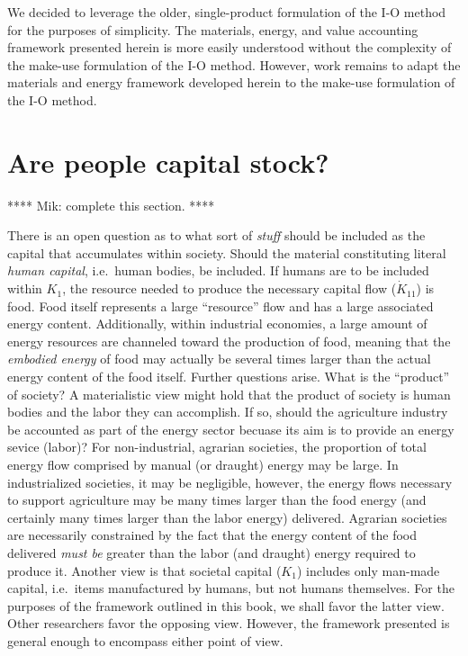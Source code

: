 We decided to leverage the older,
single-product formulation of the I-O method
for the purposes of simplicity. 
The materials, energy, and value accounting framework
presented herein is more easily understood 
without the complexity of the make-use formulation 
of the I-O method.
However, work remains to adapt the materials and energy framework
developed herein to the make-use formulation of the I-O method.


\section{Are people capital stock?}
\label{sec:people_as_stock}

**** Mik: complete this section. ****

There is an open
question as to what sort of \emph{stuff} 
should be included as the capital
that accumulates within society. 
Should the material constituting literal
\emph{human capital}, 
i.e.~human bodies, 
be included. 
If humans are to be included within $K_{1}$, 
the resource needed to produce the necessary capital
flow ($\dot{K}_{11}$) is food. 
Food itself represents a large ``resource''
flow and has a large associated energy content. 
Additionally, 
within industrial economies, 
a large amount of energy resources 
are channeled toward the production of food, 
meaning that the \emph{embodied energy}
of food may actually be several times larger than
the actual energy content of the food itself. 
Further questions arise. 
What is the ``product'' of society? 
A materialistic view might hold that the product of
society is human bodies and the labor they can accomplish. 
If so, 
should the agriculture industry 
be accounted as part of the energy sector 
becuase its aim is to provide 
an energy sevice (labor)? 
For non-industrial, agrarian societies, 
the proportion of total energy flow 
comprised by manual (or draught) energy 
may be large. 
In industrialized societies, 
it may be negligible, 
however, 
the energy flows necessary to support agriculture
may be many times larger than the food energy
(and certainly many times larger 
than the labor energy) 
delivered. 
Agrarian societies
are necessarily constrained by the fact that the energy content of the food delivered 
\emph{must be} greater than the labor (and draught) energy required to produce it.
Another view is that societal capital ($K_{1}$) includes only man-made capital, 
i.e.\ items manufactured by humans,
but not humans themselves. 
For the purposes of the framework outlined in this book, 
we shall favor the latter view.
Other researchers favor the opposing view.\cite{Giampietro2013}
However,
the framework presented is general enough to encompass either point of view.


